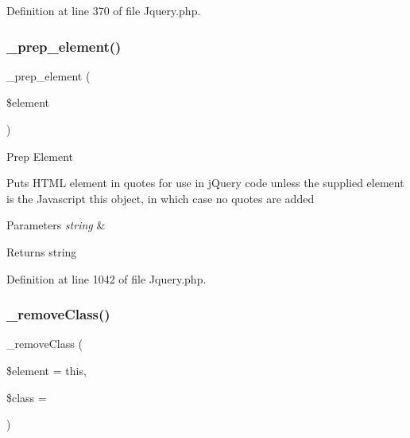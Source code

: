 Definition at line 370 of file Jquery.\+php.

\mbox{\label{class_c_i___jquery_a6dd4fcc0640975784e69d1ea11eba291}} 
\subsubsection{\texorpdfstring{\_prep\_element()}{\_prep\_element()}}
{\footnotesize\ttfamily \+\_\+prep\+\_\+element (\begin{DoxyParamCaption}\item[{}]{\$element }\end{DoxyParamCaption})\hspace{0.3cm}{\ttfamily [protected]}}

Prep Element

Puts H\+T\+ML element in quotes for use in j\+Query code unless the supplied element is the Javascript \textquotesingle{}this\textquotesingle{} object, in which case no quotes are added


\begin{DoxyParams}{Parameters}
{\em string} & \\
\hline
\end{DoxyParams}
\begin{DoxyReturn}{Returns}
string 
\end{DoxyReturn}


Definition at line 1042 of file Jquery.\+php.

\mbox{\label{class_c_i___jquery_af268174048a2d84ad3df004cec7b0a04}} 
\subsubsection{\texorpdfstring{\_removeClass()}{\_removeClass()}}
{\footnotesize\ttfamily \+\_\+remove\+Class (\begin{DoxyParamCaption}\item[{}]{\$element = {\ttfamily \textquotesingle{}this\textquotesingle{}},  }\item[{}]{\$class = {\ttfamily \textquotesingle{}\textquotesingle{}} }\end{DoxyParamCaption})\hspace{0.3cm}{\ttfamily [protected]}}


